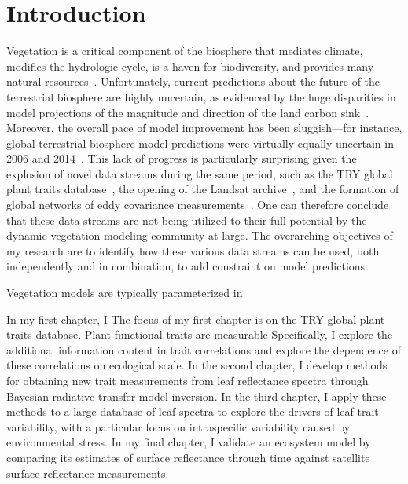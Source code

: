 \chapter{Introduction}\label{chapter:Introduction}
\thispagestyle{myheadings}

Vegetation is a critical component of the biosphere that mediates climate, modifies the hydrologic cycle, is a haven for biodiversity, and provides many natural resources~\cite{bonan_forests_2008}.
Unfortunately, current predictions about the future of the terrestrial biosphere are highly uncertain, as evidenced by the huge disparities in model projections of the magnitude and direction of the land carbon sink~\cite{friedlingstein_uncertainties_2014}.
Moreover, the overall pace of model improvement has been sluggish---for instance, global terrestrial biosphere model predictions were virtually equally uncertain in 2006 and 2014~\cite{friedlingstein_2006_climate,friedlingstein_uncertainties_2014}.
This lack of progress is particularly surprising given the explosion of novel data streams during the same period, such as the TRY global plant traits database~\cite{kattge2009_try}, the opening of the Landsat archive~\cite{woodcock_2008_free}, and the formation of global networks of eddy covariance measurements~\cite{baldocchi_2008_breathing}.
One can therefore conclude that these data streams are not being utilized to their full potential by the dynamic vegetation modeling community at large.
The overarching objectives of my research are to identify how these various data streams can be used, both independently and in combination, to add constraint on model predictions.

Vegetation models are typically parameterized in

In my first chapter, I 
The focus of my first chapter is on the TRY global plant traits database.
Plant functional traits are measurable 
Specifically, I explore the additional information content in trait correlations and explore the dependence of these correlations on ecological scale.
In the second chapter, I develop methods for obtaining new trait measurements from leaf reflectance spectra through Bayesian radiative transfer model inversion.
In the third chapter, I apply these methods to a large database of leaf spectra to explore the drivers of leaf trait variability, with a particular focus on intraspecific variability caused by environmental stress.
In my final chapter, I validate an ecosystem model by comparing its estimates of surface reflectance through time against satellite surface reflectance measurements.
